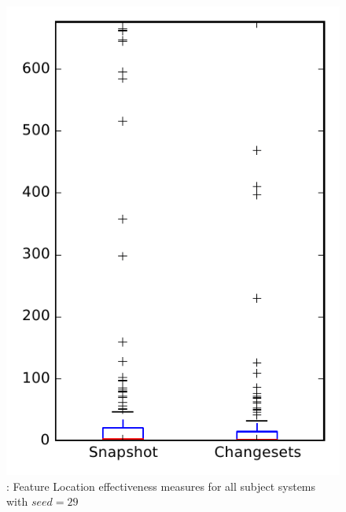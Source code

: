 
\begin{figure}
\centering
\includegraphics[height=0.4\textheight]{figures/flt_seed/rq1_overview_29}
\caption{\rone: Feature Location effectiveness measures for all subject systems with $seed=29$}
\label{fig:flt_seed:rq1:overview}
\end{figure}
